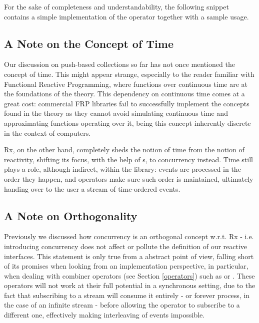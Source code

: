 For the sake of completeness and understandability, the following snippet contains a simple implementation of the  operator together with a sample usage.



\subsection{A Note on the Concept of Time}

Our discussion on push-based collections so far has not once mentioned the concept of time. This might appear strange, especially to the reader familiar with Functional Reactive Programming, where functions over continuous time are at the foundations of the theory. This dependency on continuous time comes at a great cost: commercial FRP libraries fail to successfully implement the concepts found in the theory\cite{elliott2014denotational} as they cannot avoid simulating continuous time and approximating functions operating over it, being this concept inherently discrete in the context of computers.

Rx, on the other hand, completely sheds the notion of time from the notion of reactivity\cite{meijer2010observable}, shifting its focus, with the help of s, to concurrency instead. Time still plays a role, although indirect, within the library: events are processed in the order they happen, and operators make sure such order is maintained, ultimately handing over to the user a stream of time-ordered events.

\subsection{A Note on Orthogonality}

Previously we discussed how concurrency is an orthogonal concept w.r.t. Rx - i.e. introducing concurrency does not affect or pollute the definition of our reactive interfaces. This statement is only true from a abstract point of view, falling short of its promises when looking from an implementation perspective, in particular, when dealing with combiner operators (see Section \ref{operators}) such as \code{(>>=)} or . These operators will not work at their full potential in a synchronous setting, due to the fact that subscribing to a stream will consume it entirely - or forever process, in the case of an infinite stream - before allowing the operator to subscribe to a different one, effectively making interleaving of events impossible. 

